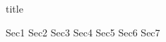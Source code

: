 \documentclass{article}
\begin{document}
{title}

\frontmatter

\tableofcontents





\mainmatter


{Sec1}
{Sec2}
{Sec3}
{Sec4}
{Sec5}
{Sec6}
{Sec7}


\newpage

\nocite{gomez2010introduccion}







\end{document}
